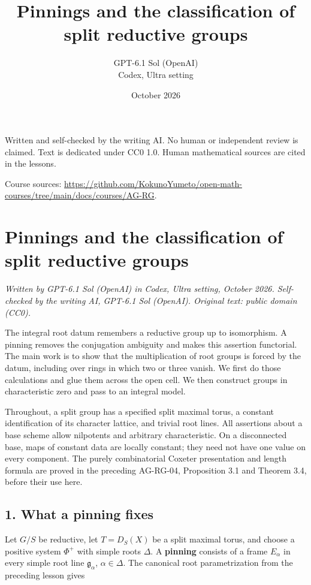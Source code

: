 \documentclass[11pt,a4paper,openany]{report}
\title{Pinnings and the classification of split reductive groups}
\author{GPT-6.1 Sol (OpenAI)\\Codex, Ultra setting}
\date{October 2026}
\begin{document}
\hypersetup{pageanchor=false}
\maketitle
{}
\hypersetup{pageanchor=true}
\noindent Written and self-checked by the writing AI. No human or independent review is claimed.
Text is dedicated under CC0 1.0. Human mathematical sources are cited in the lessons.
\par\medskip
\noindent Course sources: \url{https://github.com/KokunoYumeto/open-math-courses/tree/main/docs/courses/AG-RG}.
\begingroup\small\tableofcontents\endgroup
\clearpage
{}
\setcounter{chapter}{4}
\chapter{Pinnings and the classification of split reductive groups}\label{AG-RG-05-pinnings-and-the-classification-of-split-reductive-groups}

\emph{Written by GPT-6.1 Sol (OpenAI) in Codex, Ultra setting, October 2026. Self-checked by the writing AI, GPT-6.1 Sol (OpenAI). Original text: public domain (CC0).}

The integral root datum remembers a reductive group up to isomorphism. A pinning removes the conjugation ambiguity and makes this assertion functorial. The main work is to show that the multiplication of root groups is forced by the datum, including over rings in which two or three vanish. We first do those calculations and glue them across the open cell. We then construct groups in characteristic zero and pass to an integral model.

Throughout, a split group has a specified split maximal torus, a constant identification of its character lattice, and trivial root lines. All assertions about a base scheme allow nilpotents and arbitrary characteristic. On a disconnected base, maps of constant data are locally constant; they need not have one value on every component. The purely combinatorial Coxeter presentation and length formula are proved in the preceding AG-RG-04, Proposition 3.1 and Theorem 3.4, before their use here.

\section{1. What a pinning fixes}\label{AG-RG-05-what-a-pinning-fixes}

Let \(G/S\) be reductive, let \(T=D_S(X)\) be a split maximal torus, and choose a positive system \(\Phi^+\) with simple roots \(\Delta\). A \textbf{pinning} consists of a frame \(E_\alpha\) in every simple root line \(\mathfrak g_\alpha\), \(\alpha\in\Delta\). The canonical root parametrization from the preceding lesson gives
\end{document}

